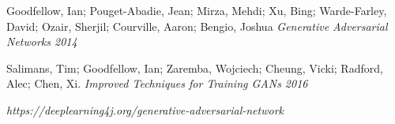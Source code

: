 \documentclass[12pt, a4paper]{report}
\begin{document}
    

    

    \newpage
    
    \newpage
    \tableofcontents

    

    \newpage
    \begin{thebibliography}{99}
        Goodfellow, Ian; Pouget-Abadie, Jean; Mirza, Mehdi; Xu, Bing; Warde-Farley, 
        David; Ozair, Sherjil; Courville, Aaron; Bengio, Joshua 
        \textit{Generative Adversarial Networks 2014}
    
        Salimans, Tim; Goodfellow, Ian; Zaremba, Wojciech; Cheung, Vicki; 
        Radford, Alec; Chen, Xi. 
        \textit{Improved Techniques for Training GANs 2016}

      \textit{https://deeplearning4j.org/generative-adversarial-network}

\end{thebibliography}
\end{document}
